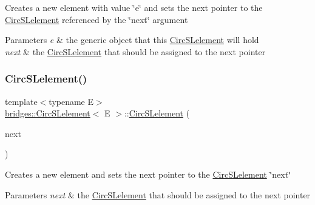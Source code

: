 Creates a new element with value \char`\"{}e\char`\"{} and sets the next pointer to the \mbox{\hyperlink{classbridges_1_1_circ_s_lelement}{Circ\+S\+Lelement}} referenced by the \char`\"{}next\char`\"{} argument


\begin{DoxyParams}{Parameters}
{\em e} & the generic object that this \mbox{\hyperlink{classbridges_1_1_circ_s_lelement}{Circ\+S\+Lelement}} will hold \\
\hline
{\em next} & the \mbox{\hyperlink{classbridges_1_1_circ_s_lelement}{Circ\+S\+Lelement}} that should be assigned to the next pointer \\
\hline
\end{DoxyParams}
\mbox{\label{classbridges_1_1_circ_s_lelement_a1fda146fc0da1d8c7d6440cbbbb2ce42}} 
\subsubsection{\texorpdfstring{Circ\+S\+Lelement()}{CircSLelement()}\hspace{0.1cm}{\footnotesize\ttfamily [4/8]}}
{\footnotesize\ttfamily template$<$typename E$>$ \\
\mbox{\hyperlink{classbridges_1_1_circ_s_lelement}{bridges\+::\+Circ\+S\+Lelement}}$<$ E $>$\+::\mbox{\hyperlink{classbridges_1_1_circ_s_lelement}{Circ\+S\+Lelement}} (\begin{DoxyParamCaption}\item[{\mbox{\hyperlink{classbridges_1_1_circ_s_lelement}{Circ\+S\+Lelement}}$<$ E $>$ $\ast$}]{next }\end{DoxyParamCaption})\hspace{0.3cm}{\ttfamily [inline]}}

Creates a new element and sets the next pointer to the \mbox{\hyperlink{classbridges_1_1_circ_s_lelement}{Circ\+S\+Lelement}} \char`\"{}next\char`\"{} 
\begin{DoxyParams}{Parameters}
{\em next} & the \mbox{\hyperlink{classbridges_1_1_circ_s_lelement}{Circ\+S\+Lelement}} that should be assigned to the next pointer \\
\hline
\end{DoxyParams}
\mbox{\label{classbridges_1_1_circ_s_lelement_a86183d3487b906550d8f32bda3a68f98}} 
